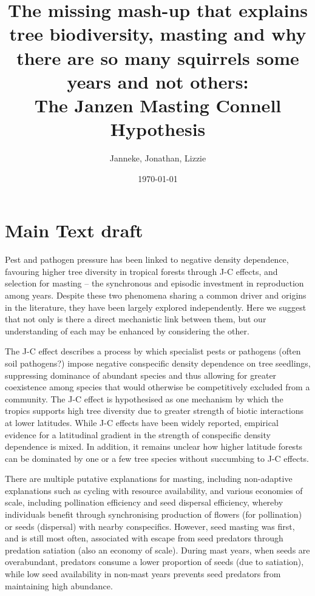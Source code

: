 \documentclass[11pt]{article}
\begin{document}

\renewcommand{\refname}{\CHead{}}

\setlength{\parindent}{0cm}
\setlength{\parskip}{5pt}

\title{The missing mash-up that explains tree biodiversity, masting and why there are so many squirrels some years and not others: \\ The Janzen Masting Connell Hypothesis}
\author{Janneke, Jonathan, Lizzie}
\date{\today}
\maketitle
\tableofcontents

\section{Main Text draft}

Pest and pathogen pressure has been linked to negative density dependence, favouring higher tree diversity in tropical forests through J-C effects, and selection for masting – the synchronous and episodic investment in reproduction among years. Despite these two phenomena sharing a common driver and origins in the literature, they have been largely explored independently. Here we suggest that not only is there a direct mechanistic link between them, but our understanding of each may be enhanced by considering the other.

The J-C effect describes a process by which specialist pests or pathogens (often soil pathogens?) impose negative conspecific density dependence on tree seedlings, suppressing dominance of abundant species and thus allowing for greater coexistence among species that would otherwise be competitively excluded from a community. The J-C effect is hypothesised as one mechanism by which the tropics supports high tree diversity due to greater strength of biotic interactions at lower latitudes. While J-C effects have been widely reported, empirical evidence for a latitudinal gradient in the strength of conspecific density dependence is mixed. In addition, it remains unclear how higher latitude forests can be dominated by one or a few tree species without succumbing to J-C effects.

There are multiple putative explanations for masting, including non-adaptive explanations such as cycling with resource availability, and various economies of scale, including pollination efficiency and seed dispersal efficiency, whereby individuals benefit through synchronising production of flowers (for pollination) or seeds (dispersal) with nearby conspecifics. However, seed masting was first, and is still most often, associated with escape from seed predators through predation satiation (also an economy of scale). During mast years, when seeds are overabundant, predators consume a lower proportion of seeds (due to satiation), while low seed availability in non-mast years prevents seed predators from maintaining high abundance.
\end{document}
